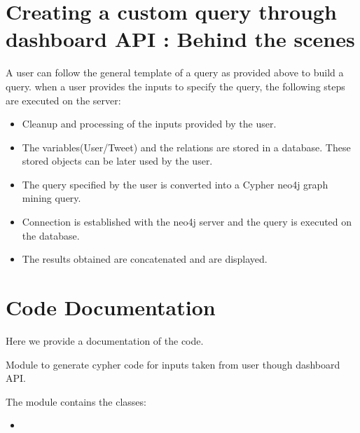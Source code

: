 \documentclass[letterpaper,10pt,english]{sphinxmanual}
\begin{document}
\section{Creating a custom query through dashboard API : Behind the scenes}
\label{\detokenize{neo4j_query_generation:creating-a-custom-query-through-dashboard-api-behind-the-scenes}}
A user can follow the general template of a query as provided above to build a query.
when a user provides the inputs to specify the query, the following steps are executed on the server:
\begin{itemize}
\item {} 
Cleanup and processing of the inputs provided by the user.

\item {} 
The variables(User/Tweet) and the relations are stored in a database. These stored objects can be later used by the user.

\item {} 
The query specified by the user is converted into a Cypher neo4j graph mining query.

\item {} 
Connection is established with the neo4j server and the query is executed on the database.

\item {} 
The results obtained are concatenated and are displayed.

\end{itemize}


\section{Code Documentation}
\label{\detokenize{neo4j_query_generation:code-documentation}}
Here we provide a documentation of the code.

\label{\detokenize{neo4j_query_generation:module-generate_queries}}
Module to generate cypher code for inputs taken from user though dashboard API.

The {\hyperref[\detokenize{neo4j_query_generation:module-generate_queries}]{}} module contains the classes:
\begin{itemize}
\item {} 
{\hyperref[\detokenize{neo4j_query_generation:generate_queries.CreateQuery}]{}}

\end{itemize}
\end{document}
